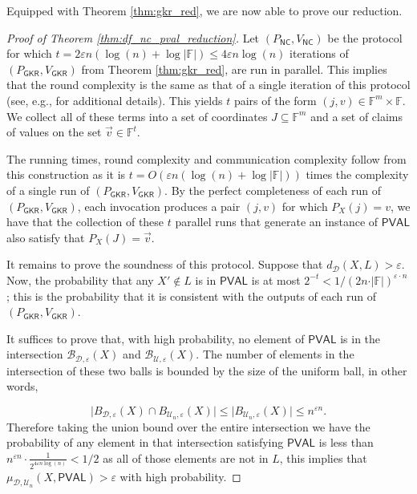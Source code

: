 \documentclass[11pt]{article}
\newcommand{\NC}{\mathsf{NC}}
\newcommand{\PVAL}{\mathsf{PVAL}}
\newcommand{\F}{\mathbb{F}}
\newcommand{\sU}{\mathcal{U}}
\newcommand{\sD}{\mathcal{D}}
\newcommand{\sB}{\mathcal{B}}
\begin{document}
\noindent Equipped with Theorem \ref{thm:gkr_red}, we are now able to prove our reduction.

\begin{proof}[Proof of Theorem \ref{thm:df_nc_pval_reduction}]
Let $(P_{\NC}, V_{\NC})$ be the protocol for which $t=2\varepsilon n (\log (n) +\log \vert \mathbb{F}\vert )\leq 4\varepsilon n \log (n)$ iterations of $(P_{\mathsf{GKR}}, V_{\mathsf{GKR}})$ from Theorem \ref{thm:gkr_red}, are run in parallel. This implies that the round complexity is the same as that of a single iteration of this protocol (see, e.g., \cite[Appendix A]{GR17_round_hierarchy} for additional details). This yields $t$ pairs of the form $(j,v)\in \mathbb{F}^{m}\times \mathbb{F}$. We collect all of these terms into a set of coordinates $J\subseteq \mathbb{F}^{m}$ and a set of claims of values on the set $\vec{v}\in \mathbb{F}^{t}$.

The running times, round complexity and communication complexity follow from this construction as it is $t=O(\varepsilon n (\log (n) + \log \vert \mathbb{F} \vert ))$ times the complexity of a single run of $(P_{\mathsf{GKR}}, V_{\mathsf{GKR}})$. By the perfect completeness of each run of $(P_{\mathsf{GKR}}, V_{\mathsf{GKR}})$, each invocation produces a pair $(j,v)$ for which $P_X(j)=v$, we have that the collection of these $t$  parallel runs that generate an instance of $\PVAL$ also satisfy that $P_X(J)=\vec{v}$. 

It remains to prove the soundness of this protocol. Suppose that $d_{\mathcal{D}}(X,L)>\varepsilon$. Now, the probability that any $X'\not \in L$ is in $\PVAL$ is at most $2^{-t}<1/(2n\cdot \vert \F\vert )^{\varepsilon \cdot n}$; this is the probability that it is consistent with the outputs of each run of $(P_{\mathsf{GKR}}, V_{\mathsf{GKR}})$. 

It suffices to prove that, with high probability, no element of $\PVAL$ is in the intersection $\sB_{\sD,\varepsilon}(X)$ and $\sB_{\sU,\varepsilon}(X)$. The number of elements in the intersection of these two balls is bounded by the size of the uniform ball, in other words,

\begin{equation*}
    \vert B_{\mathcal{D},\varepsilon}(X)\cap B_{\mathcal{U}_{n},\varepsilon}(X)\vert\leq\vert B_{\mathcal{U}_{n},\varepsilon}(X)\vert\leq n^{\varepsilon n}.
\end{equation*}
Therefore taking the union bound over the entire intersection we have the probability of any element in that intersection satisfying $\PVAL$ is less than $n^{\varepsilon n} \cdot \frac{1}{2^{4 \varepsilon n \log (n)}}<1/2$ as all of those elements are not in $L$, this  implies that $\mu_{\mathcal{D}, \mathcal{U}_{n}}(X,\PVAL)>\varepsilon$ with high probability.
\end{proof}
\end{document}

